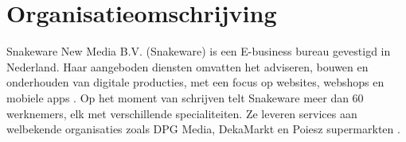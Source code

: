 \section{Organisatieomschrijving}
Snakeware New Media B.V. (Snakeware) is een E-business bureau gevestigd in Nederland.
Haar aangeboden diensten omvatten het adviseren, bouwen en onderhouden van digitale
producties, met een focus op websites, webshops en mobiele apps \Parencite{SnakewareWhatWeDo}. Op
het moment van schrijven telt Snakeware meer dan 60 werknemers, elk met verschillende
specialiteiten. Ze leveren services aan welbekende organisaties zoals DPG Media, DekaMarkt
en Poiesz supermarkten \Parencite{SnakewareCases}.
